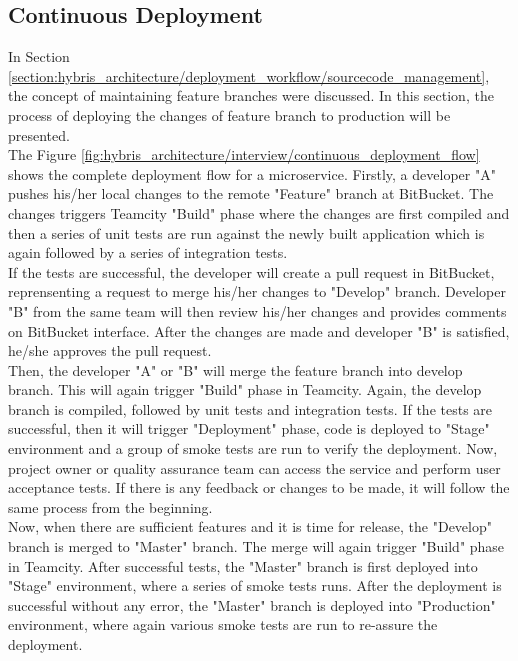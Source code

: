 \subsection{Continuous Deployment}\label{section:hybris_architecture/deployment_workflow/continuous_Deployment}
In Section \ref{section:hybris_architecture/deployment_workflow/sourcecode_management}, the concept of maintaining feature branches were discussed. In this section, the process of deploying the changes of feature branch to production will be presented.\\
The Figure \ref{fig:hybris_architecture/interview/continuous_deployment_flow} shows the complete deployment flow for a microservice. Firstly, a developer "A" pushes his/her local changes to the remote "Feature" branch at BitBucket. The changes triggers Teamcity "Build" phase where the changes are first compiled and then a series of unit tests are run against the newly built application which is again followed by a series of integration tests.\\
If the tests are successful, the developer will create a pull request in BitBucket, reprensenting a request to merge his/her changes to "Develop" branch. Developer "B" from the same team will then review his/her changes and provides comments on BitBucket interface. After the changes are made and developer "B" is satisfied, he/she approves the pull request.\\
Then, the developer "A" or "B" will merge the feature branch into develop branch. This will again trigger "Build" phase in Teamcity. Again, the develop branch is compiled, followed by unit tests and integration tests. If the tests are successful, then it will trigger "Deployment" phase, code is deployed to "Stage" environment and a group of smoke tests are run to verify the deployment. Now, project owner or quality assurance team can access the service and perform user acceptance tests. If there is any feedback or changes to be made, it will follow the same process from the beginning.\\
Now, when there are sufficient features and it is time for release, the "Develop" branch is merged to "Master" branch. The merge will again trigger "Build" phase in Teamcity. After successful tests, the "Master" branch is first deployed into "Stage" environment, where a series of smoke tests runs. After the deployment is successful without any error, the "Master" branch is deployed into "Production" environment, where again various smoke tests are run to re-assure the deployment.
